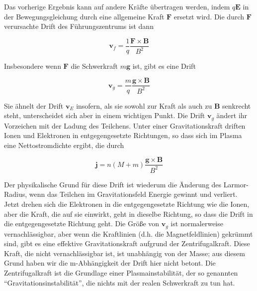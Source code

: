 \documentclass[
  a4paper,
  DIV=11]{scrreprt}
\begin{document}
Das vorherige Ergebnis kann auf andere Kräfte übertragen werden, indem
\(q\mathbf{E}\) in der Bewegungsgleichung durch eine allgemeine Kraft
\(\mathbf{F}\) ersetzt wird. Die durch \(\mathbf{F}\) verursachte Drift
des Führungszentrums ist dann

\[
\mathbf{v}_f = \frac{1}{q}\frac{\mathbf{F}\times\mathbf{B}}{B^2}
\]

Insbesondere wenn \(\mathbf{F}\) die Schwerkraft \(m\mathbf{g}\) ist,
gibt es eine Drift

\[
\mathbf{v}_g = \frac{m}{q}\frac{\mathbf{g}\times\mathbf{B}}{B^2}
\]

Sie ähnelt der Drift \(\mathbf{v}_E\) insofern, als sie sowohl zur Kraft
als auch zu \(\mathbf{B}\) senkrecht steht, unterscheidet sich aber in
einem wichtigen Punkt. Die Drift \(\mathbf{v}_g\) ändert ihr Vorzeichen
mit der Ladung des Teilchens. Unter einer Gravitationskraft driften
Ionen und Elektronen in entgegengesetzte Richtungen, so dass sich im
Plasma eine Nettostromdichte ergibt, die durch

\[
\mathbf{j} = n(M+m)\frac{\mathbf{g}\times\mathbf{B}}{B^2}
\]

Der physikalische Grund für diese Drift ist wiederum die Änderung des
Larmor-Radius, wenn das Teilchen im Gravitationsfeld Energie gewinnt und
verliert. Jetzt drehen sich die Elektronen in die entgegengesetzte
Richtung wie die Ionen, aber die Kraft, die auf sie einwirkt, geht in
dieselbe Richtung, so dass die Drift in die entgegengesetzte Richtung
geht. Die Größe von \(\mathbf{v}_g\) ist normalerweise vernachlässigbar,
aber wenn die Kraftlinien (d.h. die Magnetfeldlinien) gekrümmt sind,
gibt es eine effektive Gravitationskraft aufgrund der Zentrifugalkraft.
Diese Kraft, die nicht vernachlässigbar ist, ist unabhängig von der
Masse; aus diesem Grund haben wir die m-Abhängigkeit der Drift hier
nicht betont. Die Zentrifugalkraft ist die Grundlage einer
Plasmainstabilität, der so genannten ``Gravitationsinstabilität'', die
nichts mit der realen Schwerkraft zu tun hat.
\end{document}
